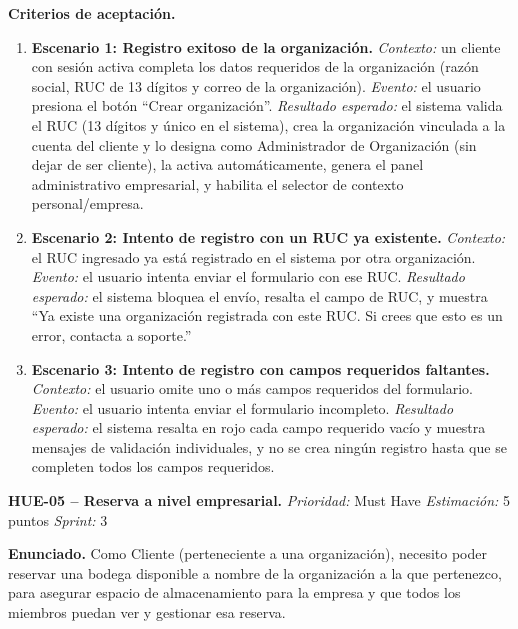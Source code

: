 \textbf{Criterios de aceptación.}
\begin{enumerate}
\item \textbf{Escenario 1: Registro exitoso de la organización.} \textit{Contexto:} un cliente con sesión activa completa los datos requeridos de la organización (razón social, RUC de 13 dígitos y correo de la organización). \textit{Evento:} el usuario presiona el botón ``Crear organización''. \textit{Resultado esperado:} el sistema valida el RUC (13 dígitos y único en el sistema), crea la organización vinculada a la cuenta del cliente y lo designa como Administrador de Organización (sin dejar de ser cliente), la activa automáticamente, genera el panel administrativo empresarial, y habilita el selector de contexto personal/empresa.
\item \textbf{Escenario 2: Intento de registro con un RUC ya existente.} \textit{Contexto:} el RUC ingresado ya está registrado en el sistema por otra organización. \textit{Evento:} el usuario intenta enviar el formulario con ese RUC. \textit{Resultado esperado:} el sistema bloquea el envío, resalta el campo de RUC, y muestra ``Ya existe una organización registrada con este RUC. Si crees que esto es un error, contacta a soporte.''
\item \textbf{Escenario 3: Intento de registro con campos requeridos faltantes.} \textit{Contexto:} el usuario omite uno o más campos requeridos del formulario. \textit{Evento:} el usuario intenta enviar el formulario incompleto. \textit{Resultado esperado:} el sistema resalta en rojo cada campo requerido vacío y muestra mensajes de validación individuales, y no se crea ningún registro hasta que se completen todos los campos requeridos.
\end{enumerate}

\textbf{HUE-05 -- Reserva a nivel empresarial.} \label{req:HUE-05}
\textit{Prioridad:} Must Have \quad \textit{Estimación:} 5 puntos \quad \textit{Sprint:} 3

\textbf{Enunciado.} Como Cliente (perteneciente a una organización), necesito poder reservar una bodega disponible a nombre de la organización a la que pertenezco, para asegurar espacio de almacenamiento para la empresa y que todos los miembros puedan ver y gestionar esa reserva.

